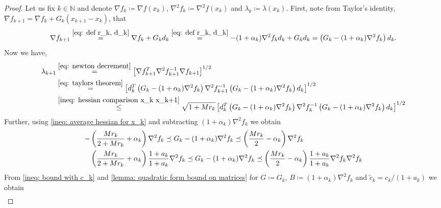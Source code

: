 \documentclass[10pt,a4paper]{amsart}
\newcommand{\N}{\mathbb{N}}
\begin{document}
\begin{proof}
Let us fix $k \in \N$ and denote $ \nabla f_{k} \coloneq\nabla f(x_{k})$, $\nabla^2 f_{k} \coloneq\nabla^2 f(x_{k})$ and $\lambda_{k} \coloneq\lambda(x_{k})$.
First, note from Taylor's identity, $\nabla f_{k+1} = \nabla f_{k} + G_k (x_{k+1} - x_k)$, that
\begin{equation} \label{eq: taylors theorem}
    \nabla f_{k+1} \overset{\eqref{eq: def r_k, d_k}}{=} \nabla f_{k} + G_k d_k \overset{\eqref{eq: def r_k, d_k}}{=} -(1 + \alpha_k) \nabla^2 f_{k} d_k + G_k d_k = \left(G_k - (1 + \alpha_k) \nabla^2 f_{k}\right) d_k.
\end{equation}
Now we have, 
    \begin{equation} \label{ineq: lambda initial}
    \begin{split}
    \lambda_{k+1} & \overset{\eqref{eq: newton decrement}}{=} \left[\nabla f_{k+1}^T \nabla^2 f_{k+1}^{-1} \nabla f_{k+1}\right]^{1/2} \\
    & \overset{\eqref{eq: taylors theorem}}{=} \left[d_k^T \left(G_k - (1 + \alpha_k) \nabla^2 f_{k}\right) \nabla^2 f_{k+1}^{-1} \left(G_k - (1 + \alpha_k) \nabla^2 f_{k}\right) d_k \right]^{1/2} \\
    & \overset{\eqref{ineq: hessian comparison x_k x_k+1}}{\leq} \sqrt{1 + M r_k} 
\left[d_k^T \left(G_k - (1 + \alpha_k) \nabla^2 f_{k}\right) \nabla^2 f_{k}^{-1} \left(G_k - (1 + \alpha_k) \nabla^2 f_{k}\right) d_k \right]^{1/2}
    \end{split}
    \end{equation}
    Further, using \eqref{ineq: average hessian for x_k} and subtracting $(1 + \alpha_k)\nabla^2 f_{k}$ we obtain 
    \begin{align}
       - & \left( \frac{M r_k}{2 + M r_k} + \alpha_k \right) \nabla^2 f_{k} \preceq G_k - (1 + \alpha_k)\nabla^2 f_{k} \preceq \left( \frac{Mr_k}{2} - \alpha_k \right)\nabla^2 f_{k} \notag \\
       & \left( \frac{M r_k}{2 + M r_k} + \alpha_k \right) \frac{1 + a_k}{1 + a_k}\nabla^2 f_{k} \preceq G_k - (1 + \alpha_k)\nabla^2 f_{k} \preceq \left( \frac{Mr_k}{2} - \alpha_k \right) \frac{1 + a_k}{1 + a_k}\nabla^2 f_{k} \nabla^2 f_{k} \label{ineq: bound with c_k}
    \end{align}
    From \eqref{ineq: bound with c_k} and \cref{lemma: quadratic form bound on matrices} for $G\coloneq G_k$, $B \coloneq (1 + \alpha_k)\nabla^2 f_{k}$ and $\tilde{c}_k = c_k / (1+a_k)$ we obtain
    \begin{align}  \label{ineq: quadratic in theorem}

\end{align}
\end{proof}
\end{document}

